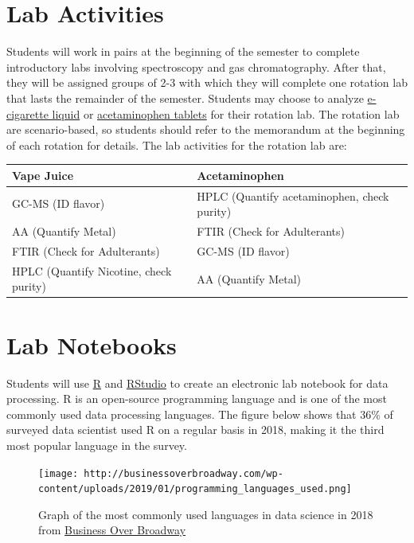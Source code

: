 \documentclass[]{tufte-book}
\begin{document}
\hypertarget{lab-activities}{%
\section*{Lab Activities}\label{lab-activities}}

Students will work in pairs at the beginning of the semester to complete introductory labs involving spectroscopy and gas chromatography. After that, they will be assigned groups of 2-3 with which they will complete one rotation lab that lasts the remainder of the semester. Students may choose to analyze \href{/chem370/lab-manual/rotation-a-e-cigarette-liquid.html}{e-cigarette liquid} or \href{/chem370/lab-manual/rotation-b-acetaminophen.html}{acetaminophen tablets} for their rotation lab. The rotation lab are scenario-based, so students should refer to the memorandum at the beginning of each rotation for details. The lab activities for the rotation lab are:

\begin{longtable}[]{@{}ll@{}}
\toprule
Vape Juice & Acetaminophen\tabularnewline
\midrule
\endhead
GC-MS (ID flavor) & HPLC (Quantify acetaminophen, check purity)\tabularnewline
AA (Quantify Metal) & FTIR (Check for Adulterants)\tabularnewline
FTIR (Check for Adulterants) & GC-MS (ID flavor)\tabularnewline
HPLC (Quantify Nicotine, check purity) & AA (Quantify Metal)\tabularnewline
\bottomrule
\end{longtable}

\hypertarget{lab-notebooks}{%
\section*{Lab Notebooks}\label{lab-notebooks}}

Students will use \href{https://cran.r-project.org/}{R} and \href{https://rstudio.com/}{RStudio} to create an electronic lab notebook for data processing. R is an open-source programming language and is one of the most commonly used data processing languages. The figure below shows that 36\% of surveyed data scientist used R on a regular basis in 2018, making it the third most popular language in the survey.

\begin{figure}
\centering
\texttt{[image: http://businessoverbroadway.com/wp-content/uploads/2019/01/programming\_languages\_used.png]}
\caption{Graph of the most commonly used languages in data science in 2018 from \href{https://businessoverbroadway.com/2019/01/13/programming-languages-most-used-and-recommended-by-data-scientists/}{Business Over Broadway}}
\end{figure}
\end{document}

